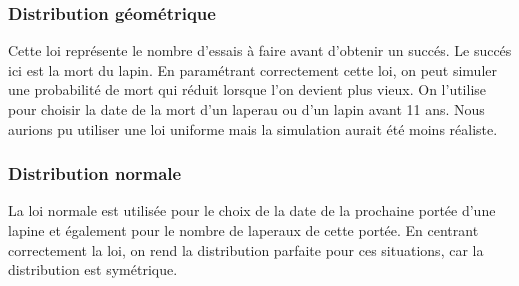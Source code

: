 \documentclass[11)pt,a4paper]{article}
\begin{document}
        \subsubsection{Distribution géométrique}
            Cette loi représente le nombre d'essais à faire avant d'obtenir un succés. Le succés ici est la mort du lapin. 
            En paramétrant correctement cette loi, on peut simuler une probabilité de mort qui réduit lorsque l'on devient plus vieux.
            On l'utilise pour choisir la date de la mort d'un laperau ou d'un lapin avant 11 ans. Nous aurions pu utiliser une loi uniforme mais la simulation aurait été moins réaliste.
            \begin{mdframed}[backgroundcolor=light-gray, roundcorner=20pt, innerleftmargin=20, innertopmargin=1, innerbottommargin=1, outerlinewidth=1, linecolor=darkgray]
                
            \end{mdframed}
            \begin{mdframed}[backgroundcolor=light-gray, roundcorner=20pt, innerleftmargin=20, innertopmargin=1, innerbottommargin=1, outerlinewidth=1, linecolor=darkgray]
                
            \end{mdframed}
        \subsubsection{Distribution normale}
            La loi normale est utilisée pour le choix de la date de la prochaine portée d'une lapine et également pour le nombre de laperaux de cette portée.
            En centrant correctement la loi, on rend la distribution parfaite pour ces situations, car la distribution est symétrique.
            \begin{mdframed}[backgroundcolor=light-gray, roundcorner=20pt, innerleftmargin=20, innertopmargin=1, innerbottommargin=1, outerlinewidth=1, linecolor=darkgray]
                
            \end{mdframed}
            \begin{mdframed}[backgroundcolor=light-gray, roundcorner=20pt, innerleftmargin=20, innertopmargin=1, innerbottommargin=1, outerlinewidth=1, linecolor=darkgray]
                
            \end{mdframed}
\end{document}

